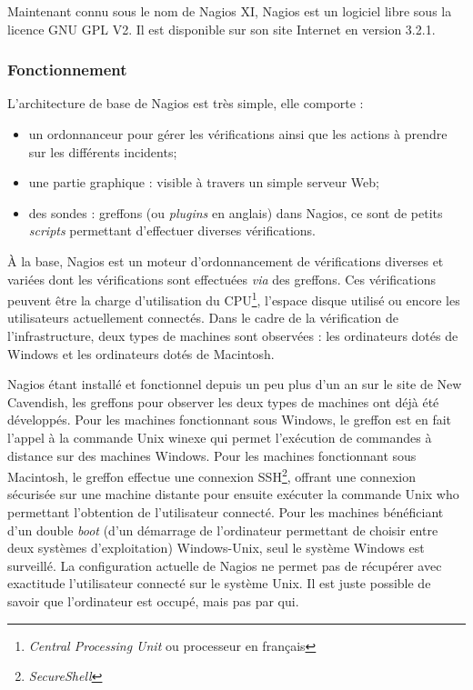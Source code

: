 Maintenant connu sous le nom de Nagios XI, Nagios est un logiciel libre sous la licence GNU GPL V2. 
Il est disponible sur son site Internet\cite{biblio:siteNagios} en version 3.2.1.

\subsubsection{Fonctionnement}

\noindent L'architecture de base de Nagios est tr\`es simple, elle comporte :

\begin{itemize}
	\item un ordonnanceur pour g\'erer les v\'erifications ainsi que les actions \`a prendre sur les diff\'erents incidents;
	\item une partie graphique : visible \`a travers un simple serveur Web;
	\item des sondes : greffons (ou \textit{plugins} en anglais) dans Nagios, ce sont de petits \textit{scripts} permettant d'effectuer diverses v\'erifications.

\end{itemize}

\vspace{0.20cm}

\`A la base, Nagios est un moteur d'ordonnancement de v\'erifications diverses et vari\'ees dont les v\'erifications sont effectu\'ees \textit{via} des greffons.
Ces v\'erifications peuvent \^etre la charge d'utilisation du CPU\protect\footnote{\textit{Central Processing Unit} ou processeur en fran\c{c}ais}, l'espace disque utilis\'e ou encore les utilisateurs actuellement connect\'es.
Dans le cadre de la v\'erification de l'infrastructure, deux types de machines sont observ\'ees : les ordinateurs dot\'es de Windows et les ordinateurs dot\'es de Macintosh.

Nagios \'etant install\'e et fonctionnel depuis un peu plus d'un an sur le site de New Cavendish, les greffons pour observer les deux types de machines ont d\'ej\`a \'et\'e d\'evelopp\'es.
Pour les machines fonctionnant sous Windows, le greffon est en fait l'appel \`a la commande Unix \textsf{winexe} qui permet l'ex\'ecution de commandes \`a distance sur des machines Windows.
Pour les machines fonctionnant sous Macintosh, le greffon effectue une connexion SSH\protect\footnote{\textit{SecureShell}}, offrant une connexion s\'ecuris\'ee sur une machine distante pour ensuite ex\'ecuter la commande Unix \textsf{who} permettant l'obtention de l'utilisateur connect\'e.
Pour les machines b\'en\'eficiant d'un double \textit{boot} (d'un d\'emarrage de l'ordinateur permettant de choisir entre deux syst\`emes d'exploitation) Windows-Unix, seul le syst\`eme Windows est surveill\'e.
La configuration actuelle de Nagios ne permet pas de r\'ecup\'erer avec exactitude l'utilisateur connect\'e sur le syst\`eme Unix.
Il est juste possible de savoir que l'ordinateur est occup\'e, mais pas par qui.

